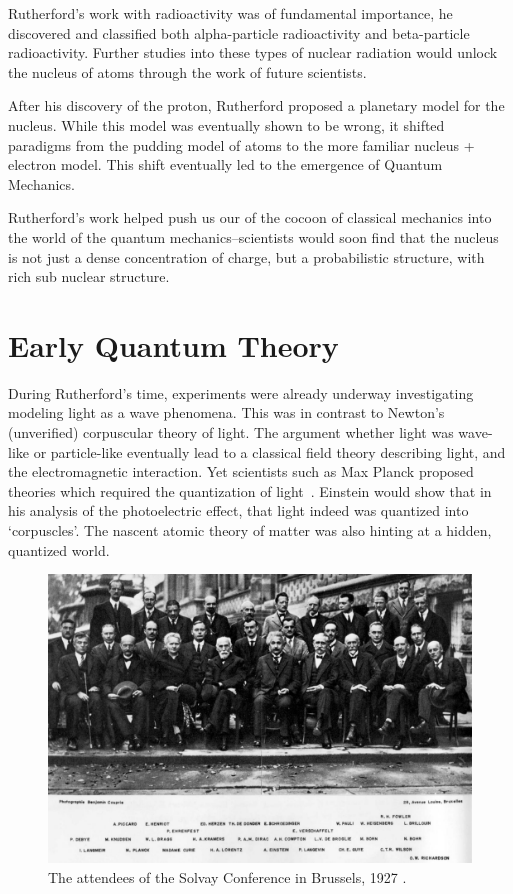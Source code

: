 Rutherford's work with radioactivity was of fundamental importance, he
discovered and classified both alpha-particle radioactivity and beta-particle
radioactivity. Further studies into these types of nuclear radiation would
unlock the nucleus of atoms through the work of future scientists.

After his discovery of the proton, Rutherford proposed a planetary model for the
nucleus. While this model was eventually shown to be wrong, it shifted paradigms
from the pudding model of atoms to the more familiar nucleus + electron model.
This shift eventually led to the emergence of Quantum Mechanics.

Rutherford's work helped push us our of the cocoon of classical mechanics into
the world of the quantum mechanics--scientists would soon find that the nucleus
is not just a dense concentration of charge, but a probabilistic structure, with
rich sub nuclear structure.

\clearpage
\section{Early Quantum Theory}

During Rutherford's time, experiments were already underway investigating
modeling light as a wave phenomena. This was in contrast to Newton's
(unverified) corpuscular theory of light. The argument whether light was
wave-like or particle-like eventually lead to a classical field theory
describing light, and the electromagnetic interaction. Yet scientists such as
Max Planck proposed theories which required the quantization of
light~\cite{Planck1901}. Einstein would show that in his analysis of the
photoelectric effect, that light indeed was quantized into `corpuscles'. The
nascent atomic theory of matter was also hinting at a hidden, quantized world.

\begin{figure}
	\centering
	\includegraphics[width=\linewidth]{./figures/solvay.jpg}
	\caption{
		The attendees of the Solvay Conference in Brussels, 1927
		 \cite{BenjaminCroupie1927}.
	}
	\label{fig:solvay}
\end{figure}

